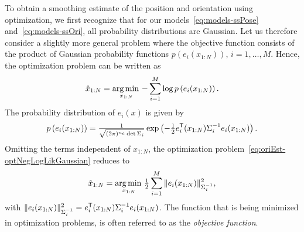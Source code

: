 \documentclass{article}
\begin{document}
\label{sec:oriEst-GNopt}
To obtain a smoothing estimate of the position and orientation using optimization, we first recognize that for our models~\eqref{eq:models-ssPose} and~\eqref{eq:models-ssOri}, all probability distributions are Gaussian. Let us therefore consider a slightly more general problem where the objective function consists of the product of Gaussian probability functions $p(e_i(x_{1:N}))$, $i = 1, \hdots, M$. Hence, the optimization problem can be written as
\begin{align}
\hat{x}_{1:N} = \operatorname*{arg \, min \,}_{x_{1:N}} - \sum_{i = 1}^M \log p \left(e_i (x_{1:N}) \right). \label{eq:oriEst-optNegLogLikGaussian}
\end{align}
The probability distribution of $e_i(x)$ is given by
\begin{align}
p \left(e_i(x_{1:N}) \right) = \tfrac{1}{\sqrt{ (2 \pi)^{n_e} \det \Sigma_i}} \exp \left( - \tfrac{1}{2} e_i^{\mathsf{T}}(x_{1:N}) \Sigma_i^{-1} e_i(x_{1:N}) \right).
\end{align}
Omitting the terms independent of $x_{1:N}$, the optimization problem~\eqref{eq:oriEst-optNegLogLikGaussian} reduces to
\begin{align}
\label{eq:oriEst-generalNLS}
\hat x_{1:N} = \operatorname*{arg \, min \,}_{x_{1:N}} \tfrac{1}{2} \sum_{i = 1}^M \| e_i(x_{1:N}) \|_{\Sigma_i^{-1}}^2, 
\end{align}
with $\| e_i(x_{1:N}) \|_{\Sigma_i^{-1}}^2 = e^{\mathsf{T}}_i(x_{1:N}) \Sigma_i^{-1} e_i(x_{1:N})$. The function that is being minimized in optimization problems, is often referred to as the \emph{objective function}.
\end{document}
